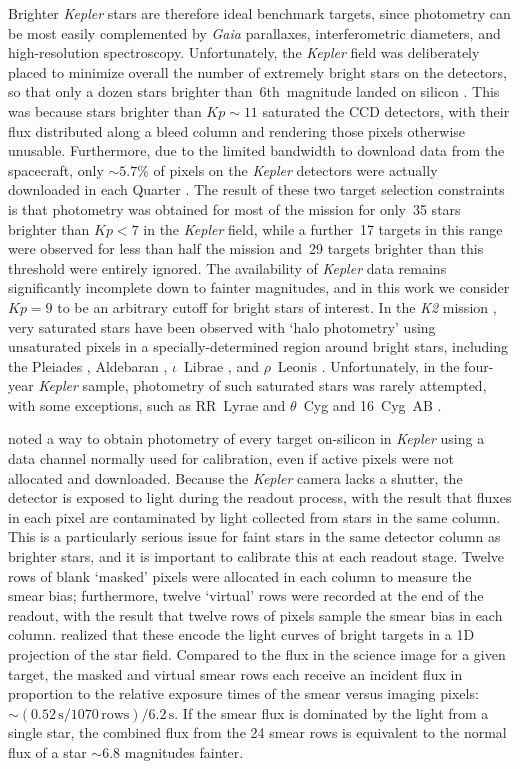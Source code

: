 \documentclass[modern]{aastex62}
\newcommand{\kepler}{\textit{Kepler}\xspace}
\newcommand{\ktwo}{\textit{K2}\xspace}
\newcommand{\gaia}{\textit{Gaia}\xspace}
\begin{document}
Brighter \kepler stars are therefore ideal benchmark targets, since photometry can be most easily complemented by \gaia parallaxes, interferometric diameters, and high-resolution spectroscopy.  
Unfortunately, the \kepler field was deliberately placed to minimize overall the number of extremely bright stars on the detectors, so that only a dozen stars brighter than~6th~magnitude landed on silicon \citep{2010ApJ...713L..79K}. This was because stars brighter than $Kp \sim 11$ saturated the CCD detectors, with their flux distributed along a bleed column and rendering those pixels otherwise unusable. Furthermore, due to the limited bandwidth to download data from the spacecraft, only $\sim 5.7\%$ of pixels on the \kepler detectors were actually downloaded in each Quarter \citep{2010ApJ...713L..87J}. The result of these two target selection constraints is that photometry was obtained for most of the mission for only~35 stars brighter than $Kp<7$ in the \kepler field, while a further~17 targets in this range were observed for less than half the mission and~29 targets brighter than this threshold were entirely ignored. The availability of \kepler data remains significantly incomplete down to fainter magnitudes, and in this work we consider $Kp=9$ to be an arbitrary cutoff for bright stars of interest. In the \ktwo mission \citep{k2early}, very saturated stars have been observed with `halo photometry' using unsaturated pixels in a specially-determined region around bright stars, including the Pleiades \citep{halo}, Aldebaran \citep{aldebaran}, $\iota$~Librae \citep{Buysschaert2018}, and $\rho$~Leonis \citep{rholeo}. Unfortunately, in the four-year \kepler sample, photometry of such saturated stars was rarely attempted, with some exceptions, such as RR~Lyrae \citep{Kolenberg2011} and $\theta$~Cyg and 16~Cyg~AB \citep[e.g.][]{thetacygwhite,Guzik2016}.

\citet{orig_smear} noted a way to obtain photometry of every target on-silicon in \kepler using a data channel normally used for calibration, even if active pixels were not allocated and downloaded. Because the \kepler camera lacks a shutter, the detector is exposed to light during the readout process, with the result that fluxes in each pixel are contaminated by light collected from stars in the same column. This is a particularly serious issue for faint stars in the same detector column as brighter stars, and it is important to calibrate this at each readout stage. Twelve rows of blank `masked' pixels were allocated in each column to measure the smear bias; furthermore, twelve `virtual' rows were recorded at the end of the readout, with the result that twelve rows of pixels sample the smear bias in each column. \citet{orig_smear} realized that these encode the light curves of bright targets in a 1D projection of the star field. Compared to the flux in the science image for a given target, the masked and virtual smear rows each receive an incident flux in proportion to the relative exposure times of the smear versus imaging pixels:  $\sim (0.52\,\text{s}/1070\,\text{rows})/6.2\,\text{s}$. If the smear flux is dominated by the light from a single star, the combined flux from the 24 smear rows is equivalent to the normal flux of a star $\sim 6.8$ magnitudes fainter.
\end{document}
